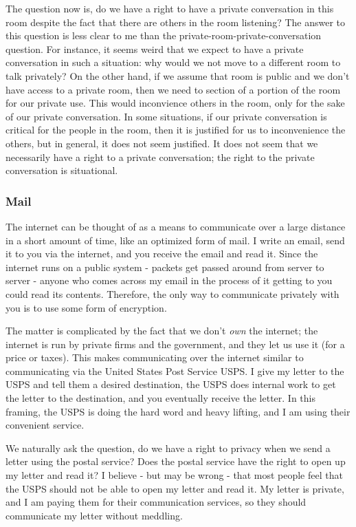 \documentclass[11pt]{article}
\begin{document}
The question now is, do we have a right to have a private conversation in this room despite the fact that there are others in the room listening?
The answer to this question is less clear to me than the private-room-private-conversation question.
For instance, it seems weird that we expect to have a private conversation in such a situation: why would we not move to a different room to talk privately?
On the other hand, if we assume that room is public and we don't have access to a private room, then we need to section of a portion of the room for our private use.
This would inconvience others in the room, only for the sake of our private conversation.
In some situations, if our private conversation is critical for the people in the room, then it is justified for us to inconvenience the others, but in general, it does not seem justified.
It does not seem that we necessarily have a right to a private conversation; the right to the private conversation is situational.

\subsubsection{Mail}

The internet can be thought of as a means to communicate over a large distance in a short amount of time, like an optimized form of mail.
I write an email, send it to you via the internet, and you receive the email and read it.
Since the internet runs on a public system - packets get passed around from server to server - anyone who comes across my email in the process of it getting to you could read its contents.
Therefore, the only way to communicate privately with you is to use some form of encryption.

The matter is complicated by the fact that we don't \textit{own} the internet; the internet is run by private firms and the government, and they let us use it (for a price or taxes). 
This makes communicating over the internet similar to communicating via the United States Post Service USPS.
I give my letter to the USPS and tell them a desired destination, the USPS does internal work to get the letter to the destination, and you eventually receive the letter.
In this framing, the USPS is doing the hard word and heavy lifting, and I am using their convenient service.

We naturally ask the question, do we have a right to privacy when we send a letter using the postal service?
Does the postal service have the right to open up my letter and read it?
I believe - but may be wrong - that most people feel that the USPS should not be able to open my letter and read it. 
My letter is private, and I am paying them for their communication services, so they should communicate my letter without meddling.
\end{document}
